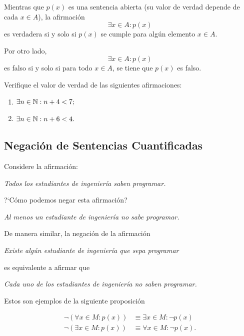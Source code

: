  Mientras que $p(x)$ es una sentencia abierta (su valor de verdad depende de cada $x\in A$), la afirmación 
 $$\exists x\in A: p(x)$$ es verdadera si y solo si $p(x)$ se cumple para algún elemento $x\in A.$  



 Por otro lado,  $$\exists x\in A: p(x)$$ es falso si y solo si para todo $ x\in A $, se tiene que $ p(x) $ es falso.



 Verifique el valor de verdad de las siguientes afirmaciones:
 \begin{enumerate}
  \item $\exists n  \in \mathbb{N}: n+4<7;$ 
  \item $\exists n \in \mathbb{N}: n+6<4.$
 \end{enumerate}



\subsection{Negación de Sentencias Cuantificadas}



 Considere la afirmación:
 \begin{center}
  \emph{Todos los estudiantes de ingeniería saben programar.}
 \end{center}
?`Cómo podemos negar esta afirmación?


\begin{center}
 \emph{Al menos un estudiante de ingeniería no sabe programar.}
\end{center} 


 De manera similar, la negación de la afirmación
 \begin{center}
  \emph{Existe algún estudiante de ingeniería que sepa programar}
 \end{center}
 es equivalente a afirmar que 
 \begin{center}
  \emph{Cada uno de los estudiantes de ingeniería no saben programar.}
 \end{center}

Estos son ejemplos de la siguiente proposición

 \begin{thm}[DeMorgan]
  \begin{align}
  \label{lip:thm:4.4}
   \neg\left( \forall x\in M: p(x) \right)& \equiv \exists x\in M: \neg p(x)\\
   \label{lip:thm:4.5}
   \neg\left( \exists x\in M: p(x) \right)& \equiv \forall x\in M: \neg p(x).
  \end{align}

 \end{thm}




